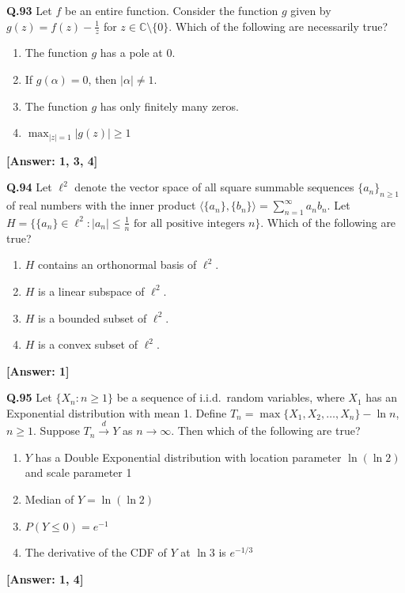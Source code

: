 \documentclass[12pt,a4paper]{article}
\newcommand{\ans}[1]{\quad\textcolor{anscolor}{\textbf{[Answer: #1]}}}
\begin{document}
\textbf{Q.93} Let $f$ be an entire function. Consider the function $g$ given by $g(z)=f(z)-\tfrac{1}{z}$ for $z\in\mathbb{C}\setminus\{0\}$. Which of the following are necessarily true?
\begin{enumerate}[label=\arabic*.]
\item The function $g$ has a pole at 0.
\item If $g(\alpha)=0$, then $|\alpha|\neq1$.
\item The function $g$ has only finitely many zeros.
\item $\max_{|z|=1}|g(z)|\ge1$
\end{enumerate}\ans{1, 3, 4}

\textbf{Q.94} Let $\ell^2$ denote the vector space of all square summable sequences $\{a_n\}_{n\ge1}$ of real numbers with the inner product $\langle\{a_n\},\{b_n\}\rangle=\sum_{n=1}^\infty a_nb_n$. Let $H=\bigl\{\{a_n\}\in\ell^2:|a_n|\le\tfrac{1}{n}\text{ for all positive integers }n\bigr\}$. Which of the following are true?
\begin{enumerate}[label=\arabic*.]
\item $H$ contains an orthonormal basis of $\ell^2$. \item $H$ is a linear subspace of $\ell^2$.
\item $H$ is a bounded subset of $\ell^2$. \item $H$ is a convex subset of $\ell^2$.
\end{enumerate}\ans{1}

\textbf{Q.95} Let $\{X_n:n\ge1\}$ be a sequence of i.i.d.\ random variables, where $X_1$ has an Exponential distribution with mean 1. Define $T_n=\max\{X_1,X_2,\ldots,X_n\}-\ln n$, $n\ge1$. Suppose $T_n\xrightarrow{d}Y$ as $n\to\infty$. Then which of the following are true?
\begin{enumerate}[label=\arabic*.]
\item $Y$ has a Double Exponential distribution with location parameter $\ln(\ln2)$ and scale parameter 1
\item Median of $Y=\ln(\ln2)$
\item $P(Y\le0)=e^{-1}$
\item The derivative of the CDF of $Y$ at $\ln3$ is $e^{-1/3}$
\end{enumerate}\ans{1, 4}
\end{document}
